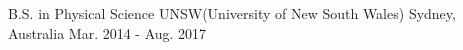 

\begin{cventries}

  \cventry
    {B.S. in Physical Science} %
    {UNSW(University of New South Wales)} %
    {Sydney, Australia} %
    {Mar. 2014 - Aug. 2017} %
    {
      \begin{cvitems} %
      \end{cvitems}
    }

\end{cventries}

